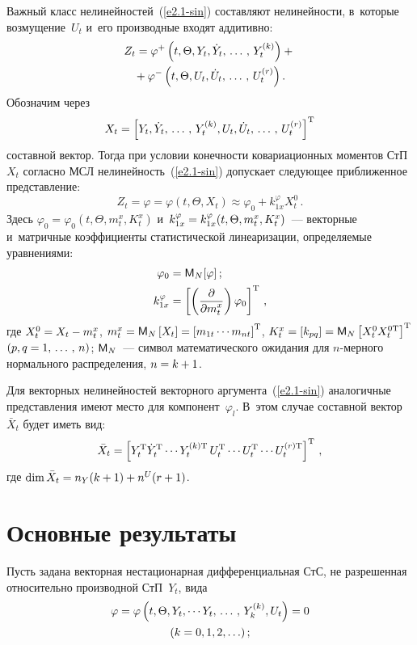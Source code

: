 \begin{multicols}{2}
 Важный класс нелинейностей~(\ref{e2.1-sin}) составляют нелинейности, в~которые 
 возмущение~$U_t$ и~его производные входят аддитивно:
   \begin{multline}
    Z_t = \varphi^+ \left(t, \Theta, Y_t, \dot Y_t,\,\ldots\,,\, Y_t^{(k)}\right) + {}\\
    {}+
    \varphi^- \left(t, \Theta, U_t, \dot U_t ,\,\ldots\,,\, U_t^{(r)}\right).
    \label{e2.2-sin}
    \end{multline}
Обозначим через 
$$
X_t = \left[ Y_t, \dot Y_t ,\,\ldots\,,\, Y_t^{(k)}, U_t, \dot 
U_t,\,\ldots\,,\, U_t^{(r)}\right]^{\mathrm{T}}
$$ 
составной вектор.
Тогда при условии конечности ковариационных моментов СтП~$X_t$ согласно 
МСЛ нелинейность~(\ref{e2.1-sin}) допускает следующее приближенное представление:
    \begin{equation}
    Z_t= \varphi = \varphi\left(t, \Theta, X_t\right) 
    \approx \varphi_0 + k_{1x}^\varphi X_t^0\,.
    \label{e2.3-sin}
    \end{equation}
Здесь $\varphi_0 = \varphi_0 (t, \Theta, m_t^x, K_t^x)$ 
и~$k_{1x}^\varphi\hm = k_{1x}^\varphi (t, \Theta, m_t^x, K_t^x)$~--- 
векторные и~матричные коэффициенты статистической линеаризации, определяемые 
уравнениями:
\begin{align}
\varphi_0 &= {\sf M}_N [\varphi]\,;\label{e2.4-sin}\\
    k_{1x}^\varphi &= \left[ \left(\displaystyle\frac{\displaystyle \partial\mathstrut}{\displaystyle \partial m_t^x\mathstrut}\right)
    \varphi_0\right]^{\mathrm{T}}\,,\label{e2.5-sin}
    \end{align}
где $X_t^0 = X_t \hm- m_t^x$, $m_t^x \hm= \mm_N \lk X_t\rk = \lk m_{1t} 
\cdots m_{nt}\rk^{\mathrm{T}}$, $K_t^x \hm= \lk k_{pq}\rk \hm= \mm_N \lk X_t^0 X_t^{0\mathrm{T}}
\rk^{\mathrm{T}}$ $(p,q \hm= 1\tr n)$; ${\sf M}_N$~--- символ математического 
ожидания для \mbox{$n$-мер}\-но\-го нормального распределения, $n\hm= k+1$.

Для векторных нелинейностей векторного аргумента~(\ref{e2.1-sin}) 
аналогичные представления имеют место для компонент~$\varphi_l$.  
В~этом случае составной вектор~$\bar X_t$ будет иметь вид:  
$$
\bar X_t \hm= \lk Y_t^{\mathrm{T}} \dot Y_t^{\mathrm{T}} \cdots Y_t^{(k)\mathrm{T}}\, 
U_t^{\mathrm{T}} \cdots U_t^{\mathrm{T}} \cdots U_t^{(r)\mathrm{T}}\rk^{\mathrm{T}}\,,
$$ 
где $ \mathrm{dim}\, 
\bar X_t \hm= n_Y (k+1) \hm+ n^U (r+1)$.

\section{Основные результаты}

Пусть задана векторная нестационарная дифференциальная СтС, не разрешенная 
относительно производной СтП~$Y_t$, вида
    \begin{multline}
\varphi =\varphi \left( t, \Theta, Y_t, \cdots Y_t ,\,\ldots\,,\, Y_k^{(k)}, U_t\right) =
     0 \\
     (k=0,1,2,\ldots)\,; \label{e3.1-sin}\end{multline}
     

\end{multicols}
